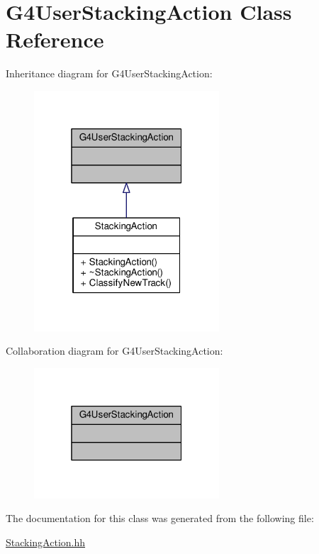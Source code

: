 \hypertarget{classG4UserStackingAction}{}\section{G4\+User\+Stacking\+Action Class Reference}
\label{classG4UserStackingAction}


Inheritance diagram for G4\+User\+Stacking\+Action\+:
\nopagebreak
\begin{figure}[H]
\begin{center}
\leavevmode
\includegraphics[width=196pt]{classG4UserStackingAction__inherit__graph}
\end{center}
\end{figure}


Collaboration diagram for G4\+User\+Stacking\+Action\+:
\nopagebreak
\begin{figure}[H]
\begin{center}
\leavevmode
\includegraphics[width=196pt]{classG4UserStackingAction__coll__graph}
\end{center}
\end{figure}


The documentation for this class was generated from the following file\+:\begin{DoxyCompactItemize}
\item 
\hyperlink{StackingAction_8hh}{Stacking\+Action.\+hh}\end{DoxyCompactItemize}
